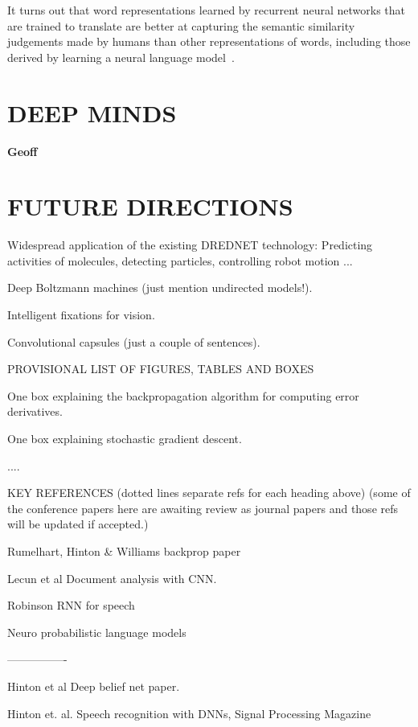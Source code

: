 \documentclass[11pt]{article} %
\begin{document}
It turns out that word representations learned by recurrent neural networks
that are trained to translate are better at capturing the semantic
similarity judgements made by humans than other representations of words,
including those derived by learning a neural language model~\citep{Hill-et-al-2014}.

\section{DEEP MINDS}


{\bf Geoff}

\section{FUTURE DIRECTIONS}


Widespread application of the existing DREDNET technology:  Predicting activities of molecules, detecting particles, controlling robot motion ...


Deep Boltzmann machines (just mention undirected models!).


Intelligent fixations for vision. 


Convolutional capsules (just a couple of sentences).


PROVISIONAL LIST OF FIGURES, TABLES AND BOXES


One box explaining the backpropagation algorithm for computing error derivatives.


One box explaining stochastic gradient descent.


....




KEY REFERENCES (dotted lines separate refs for each heading above)
(some of the conference papers here are awaiting review as journal papers and those refs will be updated if accepted.)


Rumelhart, Hinton \& Williams backprop paper 
\citep{Rumelhart86b}

Lecun et al Document analysis with CNN.
\citep{LeCun+98}

Robinson RNN for speech
\citep{Robinson+Fallside91}

Neuro probabilistic language models
\citep{BenDucVin01-short}

----------------


Hinton et al  Deep belief net paper.
\citep{Hinton06}

Hinton et. al. Speech recognition with DNNs, Signal Processing Magazine 
\citep{Hinton-et-al-2012}
\end{document}
